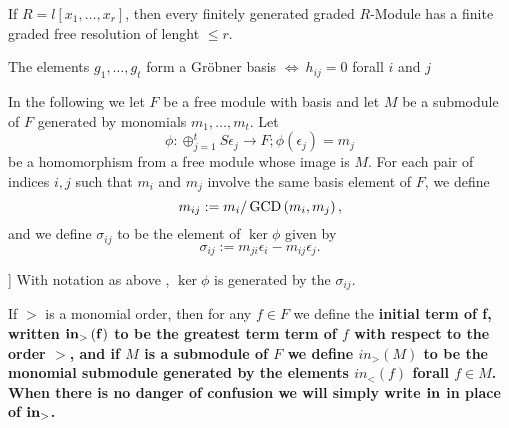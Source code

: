 \documentclass{article}
\begin{document}






\begin{thm}
	If \( R = l \left[ x_{1}, \dots ,x_{r} \right] \), 
then every finitely generated graded \( R\)-Module has a finite graded free resolution of lenght \( \le r  \).
\end{thm}



\begin{thm}
	The elements \( g_1,\dots,g_t \) form a Gr\"obner basis \( \iff \ h_{ij}=0 \) forall \( i\) and \(j\)
\end{thm}


\begin{nota}[\nocite{Eis1}]
	In the following we let
	\( F \) 
	be a free module with basis and let 
	\( M \)
	be a submodule of 
	\( F \) generated by monomials
	\( m_{1},\dots,m_{t}\).
	Let
	\[
		\phi:\oplus_{j=1}^{t} S\epsilon_{j} \to F;
		\phi\left( \epsilon_{j} \right) = m_{j}
	\]
	be a homomorphism from a free module whose image is 
	\(M \).
	For each pair of indices 
	\(i,j\)
	such that 
	\( m_{i}\)
	and 
	\( m_{j}\)
	involve the same basis element of
	\( F \),
	we define 
	\[
		m_{ij} := m_{i}/\operatorname{GCD}\left( m_{i},m_{j} \right) ,
	\]
	and we define 
	\( \sigma_{ij} \)
	to be the element of 
	\( \ker \phi \) 
	given by
	\[
		\sigma_{ij} := m_{ji}\epsilon_{i}-m_{ij}\epsilon_{j} .
	\]
\end{nota}

\begin{lem}[\cite{Eis1}[15.1]\label{syzygy_generation}]
	With notation as above 
	,
	\( \ker \phi \)
	is generated by the 
	\( \sigma_{ij}\).
\end{lem}

\begin{defn}
	If \( > \) is a monomial order, 
	then for any \( f \in F \) we define the \bf{initial term of f}, 
	written \( \bf{in}_{>}\left( f \right) \) 
	to be the greatest term term of \( f \) 
	with respect to the order \( > \), 
	and if \( M \) is a submodule of \( F\) 
	we define \( in_{>}\left( M \right) \) 
	to be the monomial submodule generated by 
	the elements \( in_{<} \left( f \right) \) 
	forall \( f \in M \). 
	When there is no danger of confusion 
	we will simply write \( \bf{in} \) in place of \( \bf{in}_{>} \).
\end{defn}
\end{document}
